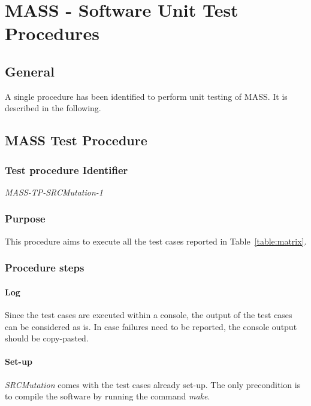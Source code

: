 
\chapter{MASS - Software Unit Test Procedures}

\section{General}

A single procedure has been identified to perform unit testing of MASS. It is described in the following.

\section{MASS Test Procedure}

\subsection{Test procedure Identifier}

\emph{MASS-TP-SRCMutation-1}


\subsection{Purpose}

This procedure aims to execute all the test cases reported in Table~\ref{table:matrix}.

\subsection{Procedure steps}

\subsubsection{Log}
Since the test cases are executed within a console, the output of the test cases can be considered as is. 
In case failures need to be reported, the console output should be copy-pasted.
\subsubsection{Set-up}
\emph{SRCMutation} comes with the test cases already set-up. The only precondition is to compile the software by running the command \emph{make}.
